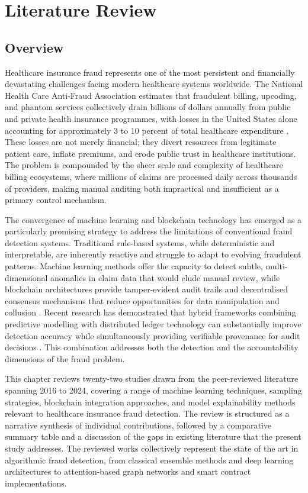 \chapter{Literature Review}

\section{Overview}

Healthcare insurance fraud represents one of the most persistent and financially devastating challenges facing modern healthcare systems worldwide. The National Health Care Anti-Fraud Association estimates that fraudulent billing, upcoding, and phantom services collectively drain billions of dollars annually from public and private health insurance programmes, with losses in the United States alone accounting for approximately 3 to 10 percent of total healthcare expenditure \cite{nhcaa2021}. These losses are not merely financial; they divert resources from legitimate patient care, inflate premiums, and erode public trust in healthcare institutions. The problem is compounded by the sheer scale and complexity of healthcare billing ecosystems, where millions of claims are processed daily across thousands of providers, making manual auditing both impractical and insufficient as a primary control mechanism.

The convergence of machine learning and blockchain technology has emerged as a particularly promising strategy to address the limitations of conventional fraud detection systems. Traditional rule-based systems, while deterministic and interpretable, are inherently reactive and struggle to adapt to evolving fraudulent patterns. Machine learning methods offer the capacity to detect subtle, multi-dimensional anomalies in claim data that would elude manual review, while blockchain architectures provide tamper-evident audit trails and decentralised consensus mechanisms that reduce opportunities for data manipulation and collusion \cite{amponsah2022}. Recent research has demonstrated that hybrid frameworks combining predictive modelling with distributed ledger technology can substantially improve detection accuracy while simultaneously providing verifiable provenance for audit decisions \cite{li2021}. This combination addresses both the detection and the accountability dimensions of the fraud problem.

This chapter reviews twenty-two studies drawn from the peer-reviewed literature spanning 2016 to 2024, covering a range of machine learning techniques, sampling strategies, blockchain integration approaches, and model explainability methods relevant to healthcare insurance fraud detection. The review is structured as a narrative synthesis of individual contributions, followed by a comparative summary table and a discussion of the gaps in existing literature that the present study addresses. The reviewed works collectively represent the state of the art in algorithmic fraud detection, from classical ensemble methods and deep learning architectures to attention-based graph networks and smart contract implementations.

